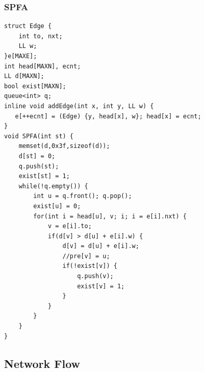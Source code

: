 \documentclass[10pt]{ctexart}
\begin{document}
{\subsubsection{SPFA}
\begin{lstlisting}
struct Edge {
    int to, nxt;
    LL w;
}e[MAXE];
int head[MAXN], ecnt;
LL d[MAXN];
bool exist[MAXN];
queue<int> q;
inline void addEdge(int x, int y, LL w) {
   e[++ecnt] = (Edge) {y, head[x], w}; head[x] = ecnt;
}
void SPFA(int st) {
    memset(d,0x3f,sizeof(d));
    d[st] = 0;
    q.push(st);
    exist[st] = 1;
    while(!q.empty()) {
        int u = q.front(); q.pop();
        exist[u] = 0;
        for(int i = head[u], v; i; i = e[i].nxt) {
            v = e[i].to;
            if(d[v] > d[u] + e[i].w) {
                d[v] = d[u] + e[i].w;
                //pre[v] = u;
                if(!exist[v]) {
                    q.push(v);
                    exist[v] = 1;
                }
            }
        }
    }
}
\end{lstlisting}
\subsection{Network Flow}
}
\end{document}

